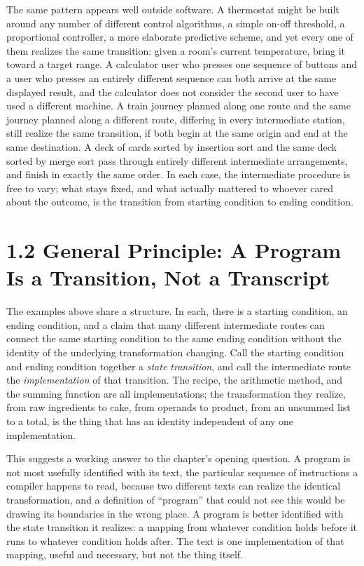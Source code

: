 \documentclass[11pt]{book}
\begin{document}
The same pattern appears well outside software. A thermostat might be built around any number of different control algorithms, a simple on-off threshold, a proportional controller, a more elaborate predictive scheme, and yet every one of them realizes the same transition: given a room's current temperature, bring it toward a target range. A calculator user who presses one sequence of buttons and a user who presses an entirely different sequence can both arrive at the same displayed result, and the calculator does not consider the second user to have used a different machine. A train journey planned along one route and the same journey planned along a different route, differing in every intermediate station, still realize the same transition, if both begin at the same origin and end at the same destination. A deck of cards sorted by insertion sort and the same deck sorted by merge sort pass through entirely different intermediate arrangements, and finish in exactly the same order. In each case, the intermediate procedure is free to vary; what stays fixed, and what actually mattered to whoever cared about the outcome, is the transition from starting condition to ending condition.

\section*{1.2 General Principle: A Program Is a Transition, Not a Transcript}

The examples above share a structure. In each, there is a starting condition, an ending condition, and a claim that many different intermediate routes can connect the same starting condition to the same ending condition without the identity of the underlying transformation changing. Call the starting condition and ending condition together a \emph{state transition}, and call the intermediate route the \emph{implementation} of that transition. The recipe, the arithmetic method, and the summing function are all implementations; the transformation they realize, from raw ingredients to cake, from operands to product, from an unsummed list to a total, is the thing that has an identity independent of any one implementation.

This suggests a working answer to the chapter's opening question. A program is not most usefully identified with its text, the particular sequence of instructions a compiler happens to read, because two different texts can realize the identical transformation, and a definition of ``program'' that could not see this would be drawing its boundaries in the wrong place. A program is better identified with the state transition it realizes: a mapping from whatever condition holds before it runs to whatever condition holds after. The text is one implementation of that mapping, useful and necessary, but not the thing itself.
\end{document}
